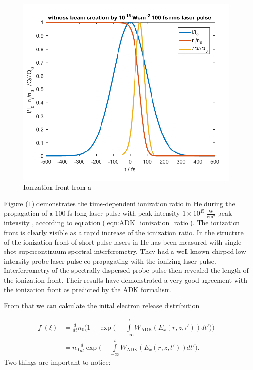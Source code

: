 \begin{figure}[h]
\begin{center}
\includegraphics[width=1.0\textwidth]{theory/images/raw/Ionization_front.pdf}
\end{center}
\caption{Ionization front from a}
\label{img:ion_front_norm}
\end{figure}
Figure (\ref{img:ion_front_norm}) demonstrates the time-dependent ionization ratio in He during the propagation of a 100 fs long laser pulse with peak intensity $1\times10^{15}\ \frac{\mathrm{W}}{\mathrm{cm}^2}$ peak intensity , according to equation (\ref{eqn:ADK_ionization_ratio}).
The ionization front is clearly visible as a rapid increase of the ionization ratio. 
In \cite{kim2002IonFrontOpticsexpress} the structure of the ionization front of short-pulse lasers in He has been measured with single-shot supercontinuum spectral interferometry. They had a well-known chirped low-intensity probe laser pulse co-propagating with the ionizing laser pulse. Interferrometry of the spectrally dispersed probe pulse then revealed the length of the ionization front. Their results have demonstrated a very good agreement with the ionization front as predicted by the ADK formalism. 

From that we can calculate the inital electron release distribution

\begin{align}
\label{eqn:ADK_ionization_ratio_dt}
f_\mathrm{i}(\xi)&= \frac{d}{dt}n_0 \Big(1-\exp\Big(-\int \limits_{-\infty}^t W_\mathrm{ADK}(E_{x}(r,z,t'))dt'\Big)\Big)\\
&=n_0 \frac{d}{dt}\exp\Big(-\int \limits_{-\infty}^t W_\mathrm{ADK}(E_{x}(r,z,t'))dt'\Big).
\end{align}
Two things are important to notice:

